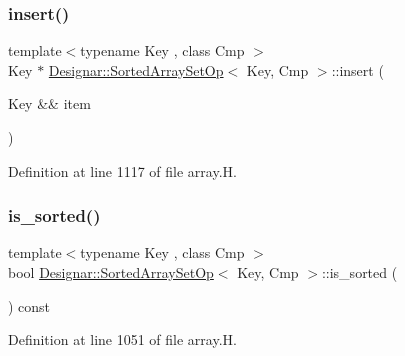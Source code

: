 \subsubsection{\texorpdfstring{insert()}{insert()}\hspace{0.1cm}{\footnotesize\ttfamily [2/2]}}
{\footnotesize\ttfamily template$<$typename Key , class Cmp $>$ \\
Key $\ast$ \hyperlink{class_designar_1_1_sorted_array_set_op}{Designar\+::\+Sorted\+Array\+Set\+Op}$<$ Key, Cmp $>$\+::insert (\begin{DoxyParamCaption}\item[{Key \&\&}]{item }\end{DoxyParamCaption})}



Definition at line 1117 of file array.\+H.

\mbox{\label{class_designar_1_1_sorted_array_set_op_aa11c07509319e513a6f8dd0f3ab7663a}} 
\subsubsection{\texorpdfstring{is\+\_\+sorted()}{is\_sorted()}}
{\footnotesize\ttfamily template$<$typename Key , class Cmp $>$ \\
bool \hyperlink{class_designar_1_1_sorted_array_set_op}{Designar\+::\+Sorted\+Array\+Set\+Op}$<$ Key, Cmp $>$\+::is\+\_\+sorted (\begin{DoxyParamCaption}{ }\end{DoxyParamCaption}) const\hspace{0.3cm}{\ttfamily [inline]}}



Definition at line 1051 of file array.\+H.

\mbox{\label{class_designar_1_1_sorted_array_set_op_a27beb3e6b8f6b83c6efa46c38e8d22f9}} 
